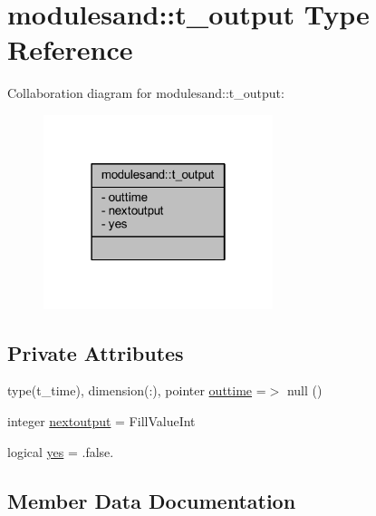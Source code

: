 \hypertarget{structmodulesand_1_1t__output}{}\section{modulesand\+:\+:t\+\_\+output Type Reference}
\label{structmodulesand_1_1t__output}


Collaboration diagram for modulesand\+:\+:t\+\_\+output\+:\nopagebreak
\begin{figure}[H]
\begin{center}
\leavevmode
\includegraphics[width=190pt]{structmodulesand_1_1t__output__coll__graph}
\end{center}
\end{figure}
\subsection*{Private Attributes}
\begin{DoxyCompactItemize}
\item 
type(t\+\_\+time), dimension(\+:), pointer \mbox{\hyperlink{structmodulesand_1_1t__output_acdaace3b0a34256c2d98d937bad1023b}{outtime}} =$>$ null ()
\item 
integer \mbox{\hyperlink{structmodulesand_1_1t__output_ab33fbb5ec0d32a5dc74cd9c05a057774}{nextoutput}} = Fill\+Value\+Int
\item 
logical \mbox{\hyperlink{structmodulesand_1_1t__output_a858e3e9c68ac8050169ece7978058642}{yes}} = .false.
\end{DoxyCompactItemize}


\subsection{Member Data Documentation}
\mbox{\label{structmodulesand_1_1t__output_ab33fbb5ec0d32a5dc74cd9c05a057774}} 
